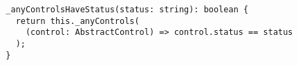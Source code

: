 \begin{verbatim}
  _anyControlsHaveStatus(status: string): boolean {
    return this._anyControls(
      (control: AbstractControl) => control.status == status
    );
  }
\end{verbatim}
